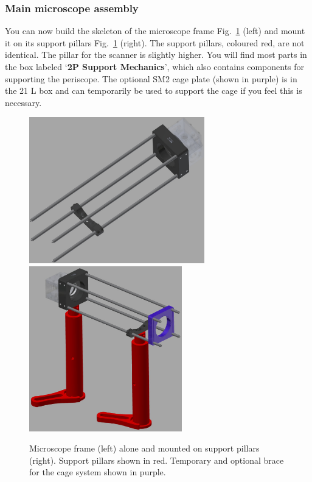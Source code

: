 \documentclass[a4paper]{report}
\begin{document}
\clearpage

\subsubsection{Main microscope assembly}
You can now build the skeleton of the microscope frame Fig.~\ref{fig:frame} (left) and mount it on its support pillars Fig.~\ref{fig:frame} (right).
The support pillars, coloured red, are not identical. 
The pillar for the scanner is slightly higher. 
You will find most parts in the box labeled `\textbf{2P Support Mechanics}', which also contains components for supporting the periscope.
The optional SM2 cage plate (shown in purple) is in the 21 L box and can temporarily be used to support the cage if you feel this is necessary. 

\begin{figure}[h]
\center
\includegraphics[width=3in]{frame.eps}
\includegraphics[width=2.61in]{mount_frame.eps}
\caption{Microscope frame (left) alone and mounted on support pillars (right). Support pillars shown in red. Temporary and optional brace for the cage system shown in purple.}
\label{fig:frame}
\end{figure}
\end{document}
